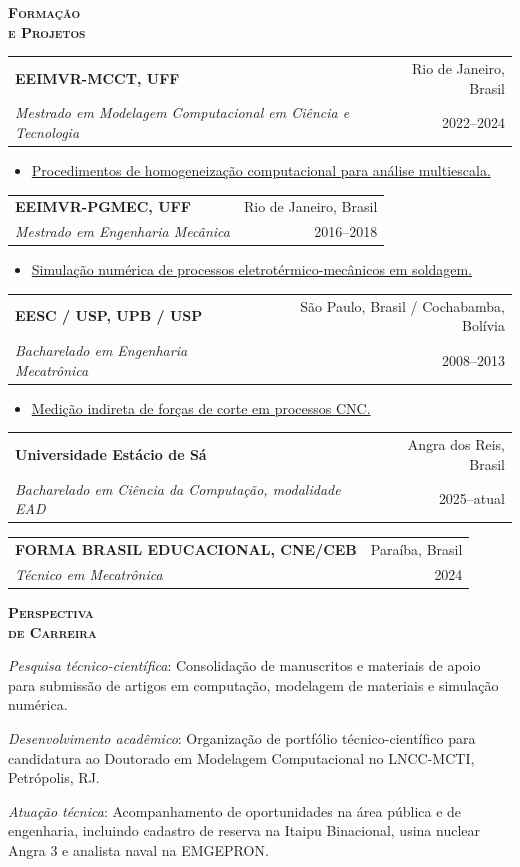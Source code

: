 \documentclass[a4paper, 10pt]{article}
\makeatletter
\newcommand{\Calluna}{\rmfamily}
\newlength{\lblwidth}
\newcommand{\sectionBlock}[2]{%
	\par\addvspace{3pt}%
	\noindent%
	\begin{mdframed}[style=cvbox]%
		\noindent%
		\begin{minipage}[t]{\lblwidth}%
			\vspace{0pt}%
			\setstretch{1.0}%
			\raggedright%
			\small\scshape\Calluna%
			#1%
		\end{minipage}%
		\hspace{6pt}%
		\begin{minipage}[t]{\dimexpr\linewidth-\lblwidth-6pt\relax}%
			\vspace{0pt}%
			\setlength{\parindent}{0pt}%
			\setlength{\parskip}{2pt}%
			#2%
		\end{minipage}%
	\end{mdframed}%
	\par\addvspace{1pt}%
}
\renewcommand{\section}[1]{%
	{\small\bfseries\scshape #1}%
}
\newcommand{\cvBlock}{%
	\justifying%
	\setlength{\parindent}{0pt}%
	\setlength{\parskip}{2pt}%
	\noindent\ignorespaces%
}
\newcommand{\cvEntry}[4]{%
	\noindent%
	\begin{tabular*}{\linewidth}{@{}l@{\extracolsep{\fill}}r@{}}
		\textbf{#1} & {\small #2} \\
		\emph{#3} & {\small #4}
	\end{tabular*}%
	\par\vspace{1pt}%
}
\newenvironment{cvItems}{%
	\begin{itemize}[
		leftmargin=1.2em,
		labelsep=0.4em,
		itemsep=0pt,
		topsep=1pt,
		parsep=0pt,
		partopsep=0pt
		]
	}{%
	\end{itemize}
}
\newcommand{\cvLine}[1]{%
	\noindent #1\par\vspace{1pt}%
}
\makeatother
\begin{document}
	\sectionBlock{
		\section{Formação\\[2pt]e Projetos}
	}{
		\cvBlock
		
		\cvEntry
		{EEIMVR-MCCT, UFF}
		{Rio de Janeiro, Brasil}
		{Mestrado em Modelagem Computacional em Ciência e Tecnologia}
		{2022--2024}
		\begin{cvItems}
			\item \href{https://drive.google.com/file/d/1fEubSSA7-rU-PD5rEgxHuHVYjIQxUjx9/view?usp=sharing}
			{Procedimentos de homogeneização computacional para análise multiescala.}
		\end{cvItems}
		
		\cvEntry
		{EEIMVR-PGMEC, UFF}
		{Rio de Janeiro, Brasil}
		{Mestrado em Engenharia Mecânica}
		{2016--2018}
		\begin{cvItems}
			\item \href{https://drive.google.com/file/d/1VzLID_a9mXDkNc7g3mvkYC9unA0O9GqH/view?usp=sharing}
			{Simulação numérica de processos eletrotérmico-mecânicos em soldagem.}
		\end{cvItems}
		
		\cvEntry
		{EESC / USP, UPB / USP}
		{São Paulo, Brasil / Cochabamba, Bolívia}
		{Bacharelado em Engenharia Mecatrônica}
		{2008--2013}
		\begin{cvItems}
			\item \href{https://drive.google.com/file/d/1wrtvWqw3lqqCWRn2qyCXGSgvPKS-htit/view?usp=sharing}
			{Medição indireta de forças de corte em processos CNC.}
		\end{cvItems}
		
		\cvEntry
		{Universidade Estácio de Sá}
		{Angra dos Reis, Brasil}
		{Bacharelado em Ciência da Computação, modalidade EAD}
		{2025--atual}
		
		\cvEntry
		{FORMA BRASIL EDUCACIONAL, CNE/CEB}
		{Paraíba, Brasil}
		{Técnico em Mecatrônica}
		{2024}
	}
	
	\sectionBlock{
		\section{Perspectiva\\[2pt]de Carreira}
	}{
		\cvBlock
		\cvLine{\emph{Pesquisa técnico-científica}: Consolidação de manuscritos e materiais de apoio
			para submissão de artigos em computação, modelagem de materiais e simulação numérica.}
		\cvLine{\emph{Desenvolvimento acadêmico}: Organização de portfólio técnico-científico para
			candidatura ao Doutorado em Modelagem Computacional no LNCC-MCTI, Petrópolis, RJ.}
		\cvLine{\emph{Atuação técnica}: Acompanhamento de oportunidades na área pública e de engenharia,
			incluindo cadastro de reserva na Itaipu Binacional, usina nuclear Angra 3 e analista naval na EMGEPRON.}
	}
	
\end{document}
